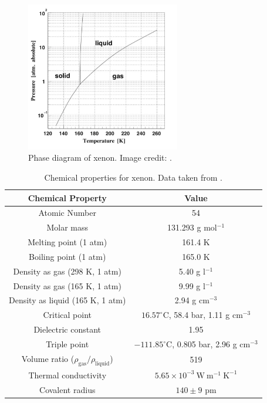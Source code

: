 \begin{figure}
\includegraphics[width=0.6\textwidth]{PhaseDiagram}
\caption{Phase diagram of xenon.  Image credit: .}
\label{fig:phase_diagram}
\end{figure}
 
\begin{table}[t]
 \centering
 \begin{tabular}{cc}
 \hline
 \hline
 Chemical Property & Value \\
 \hline
 Atomic Number & 54 \\
 Molar mass & 131.293 g mol$^{-1}$ \\
 Melting point (1 atm) & 161.4 K \\
 Boiling point (1 atm) & 165.0 K \\
 Density as gas (298 K, 1 atm)  &  5.40 g l$^{-1}$ \\
 Density as gas (165 K, 1 atm)  &  9.99 g l$^{-1}$ \\
 Density as liquid (165 K, 1 atm) & 2.94 g cm$^{-3}$ \\
 Critical point & $16.57^{\circ}$C, 58.4 bar, 1.11 g cm$^{-3}$ \\
 Dielectric constant & 1.95 \\
 Triple point & $-111.85^{\circ}$C, 0.805 bar, 2.96 g cm$^{-3}$ \\
 Volume ratio ($\rho_{\mathrm{gas}}/\rho_{\mathrm{liquid}}$) & 519 \\
 Thermal conductivity & $5.65 \times 10^{-3}\ \mathrm{W\ m^{-1}\ K^{-1}}$ \\
 Covalent radius & $140 \pm 9$ pm \\
 \hline
 \hline
 \end{tabular}
 \caption{Chemical properties for xenon.  Data taken from .}
\label{tab:xe_properties}
\end{table}

